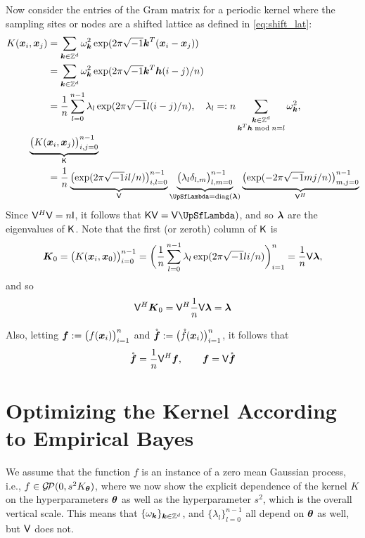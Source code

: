 \documentclass{amsart}
\newcommand{\rvf}{\mathring{\vf}}
\newcommand{\gp}{\mathcal{G}\!\mathcal{P}}
\begin{document}
Now consider the entries of the Gram matrix for a periodic kernel where the sampling sites or nodes are a shifted lattice as defined in \eqref{eq:shift_lat}:
\begin{align*}
    K(\vx_i,\vx_j)  &= \sum_{\vk \in \integers^d} \omega_{\vk}^2 \exp(2 \pi \sqrt{-1} \vk^T(\vx_i - \vx_j)) \\
    & = \sum_{\vk \in \integers^d} \omega_{\vk}^2 \exp(2 \pi \sqrt{-1} \vk^T \vh (i-j)/n) \\
    & = \frac 1n \sum_{l = 0}^{n-1} \lambda_l \exp(2 \pi \sqrt{-1} l (i-j)/n), \quad \lambda_l =: n\sum_{\substack{\vk \in \integers^d \\ \vk^T\vh \bmod n = l}} \omega_{\vk}^2, \\
    \MoveEqLeft \underbrace{\bigl ( K(\vx_i,\vx_j)\bigr)_{i,j = 0}^{n-1}}_{\mK} \\
    &
    = \frac 1n \underbrace{\bigl ( \exp(2 \pi \sqrt{-1} il/n) \bigr)_{i,l = 0}^{n-1}}_{\mV} 
    \underbrace{\bigl ( \lambda_l \delta_{l,m} \bigr)_{l,m = 0}^{n-1}}_{\mLambda = \diag(\vlambda)} 
    \underbrace{\bigl ( \exp(- 2 \pi \sqrt{-1} mj/n) \bigr)_{m,j = 0}^{n-1}}_{\mV^H}
\end{align*}
Since $\mathsf{V}^H \mathsf{V} = n \mathsf{I}$, it follows that $\mK \mV  =\mV \mLambda)$, and so $\boldsymbol{\lambda}$ are the eigenvalues of $\mathsf{K}$.  Note that the first (or zeroth) column of $\mathsf{K}$ is 
\begin{equation*}
    \boldsymbol{K}_0 = \bigl ( K(\boldsymbol{x}_i,\boldsymbol{x}_0)\bigr)_{i = 0}^{n-1}
    = \biggl( \frac 1n \sum_{l = 0}^{n-1} \lambda_l \exp(2 \pi \sqrt{-1} l i/n)\biggr)_{i=1}^n = \frac 1n \mathsf{V} \boldsymbol{\lambda},
\end{equation*}
and so 
\begin{equation*}
    \mathsf{V}^{H} \boldsymbol{K}_0 = \mathsf{V}^{H} \frac 1n \mathsf{V} \boldsymbol{\lambda} = \boldsymbol{\lambda} 
\end{equation*}

Also, letting $\boldsymbol{f} := \bigl( f(\boldsymbol{x}_i) \bigr)_{i=1}^n$ and $\rvf := \bigl( \rf(\vx_i) \bigr)_{i=1}^n$, it follows that
\begin{equation}
    \rvf = \frac 1n \mV^H \vf, \qquad \vf = \mV \rvf
\end{equation}

\section{Optimizing the Kernel According to Empirical Bayes}
We assume that the function $f$ is an instance of a zero mean Gaussian process, i.e., $f \in \gp(0,s^2K_{\vtheta})$, where we now show the explicit dependence of the
kernel $K$ on the hyperparameters $\boldsymbol{\theta}$ as well as the hyperparameter $s^2$, which is the overall vertical scale.
This means that $\{\omega_{\boldsymbol{k}}\}_{\boldsymbol{k} \in \mathbb{Z}^d}$, and $\{\lambda_l \}_{l=0}^{n-1}$ all depend on $\boldsymbol{\theta}$ as well, but $\mathsf{V}$ does not.
\end{document}
